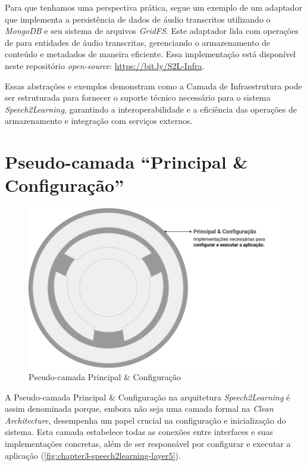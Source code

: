 Para que tenhamos uma perspectiva prática, segue um exemplo de um adaptador que implementa a persistência de dados de áudio transcritos utilizando o \textit{MongoDB} e seu sistema de arquivos \textit{GridFS}. Este adaptador lida com operações de  para entidades de áudio transcritas, gerenciando o armazenamento de conteúdo e metadados de maneira eficiente. Essa implementação está disponível neste repositório \textit{open-source}: \url{https://bit.ly/S2L-Infra}.

Essas abstrações e exemplos demonstram como a Camada de Infraestrutura pode ser estruturada para fornecer o suporte técnico necessário para o sistema \textit{Speech2Learning}, garantindo a interoperabilidade e a eficiência das operações de armazenamento e integração com serviços externos.

\section{Pseudo-camada ``Principal \& Configuração''}

\begin{figure}[htb]
\centering
\caption{Pseudo-camada Principal \& Configuração}
\label{fig:chapter3-speech2learning-layer5}
\includegraphics[width=1\textwidth]{images/chapter3-speech2learning-layer5.png}
\end{figure}

A Pseudo-camada Principal \& Configuração na arquitetura \textit{Speech2Learning} é assim denominada porque, embora não seja uma camada formal na \textit{Clean Architecture}, desempenha um papel crucial na configuração e inicialização do sistema. Esta camada estabelece todas as conexões entre interfaces e suas implementações concretas, além de ser responsável por configurar e executar a aplicação (\autoref{fig:chapter3-speech2learning-layer5}). 

